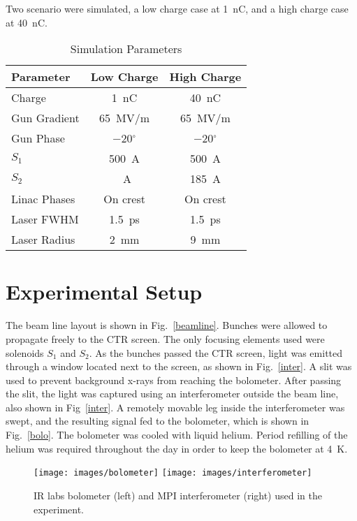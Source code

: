 \documentclass[letterpaper,  %
              ]{jacow-2_3}   %
\begin{document}
Two scenario were simulated, a low charge case at \SI{1}{nC}, and a 
high charge case at \SI{40}{nC}. 

\begin{table}[hbt]
	\centering
	\caption{Simulation Parameters}
	\begin{tabular}{lcc}
		\toprule
		\textbf{Parameter} & \textbf{Low Charge}  & \textbf{High Charge} \\
		\midrule
		Charge       & \SI{1}{nC}        & \SI{40}{nC}    \\ %
		Gun Gradient & \SI{65}{MV/m}     & \SI{65}{MV/m}  \\ %
		Gun Phase    & \SI{-20}{}$^{\circ}$ & \SI{-20}{}$^{\circ}$ \\		 
		$S_1$        & \SI{500}{A}		 & \SI{500}{A}	  \\
		$S_2$		 & \SI{}{A}   	 & \SI{185}{A}		 \\
		Linac Phases & On crest          & On crest       \\
		Laser FWHM   & \SI{1.5}{ps}      & \SI{1.5}{ps}   \\ %
		Laser Radius & \SI{2}{mm}        & \SI{9}{mm}     \\
		\bottomrule
	\end{tabular}
	\label{simparam}
\end{table}


\section{Experimental Setup}
The beam line layout is shown in Fig.~\ref{beamline}. 
Bunches were allowed to propagate freely to the 
CTR screen. The only focusing elements used were solenoids $S_1$ and
$S_2$. As the bunches passed the CTR screen, light was
emitted through a window located next to the screen, 
as shown in Fig.~\ref{inter}. A slit was used to prevent
background x-rays from reaching the bolometer.
After passing the slit, the light was captured 
using an interferometer outside the beam line, 
also shown in Fig~\ref{inter}. 
A remotely movable leg inside the interferometer was swept, 
and the resulting signal fed to the bolometer, 
which is shown in Fig.~\ref{bolo}. The bolometer 
was cooled with liquid helium. Period refilling of
the helium was required throughout the day in order
to keep the bolometer at \SI{4}{K}.
 
\begin{figure}\label{facilitypics}
 \texttt{[image: images/bolometer]}
 \texttt{[image: images/interferometer]}
 \caption{IR labs bolometer (left) and MPI interferometer (right) used in the experiment.}
\end{figure}
\end{document}
